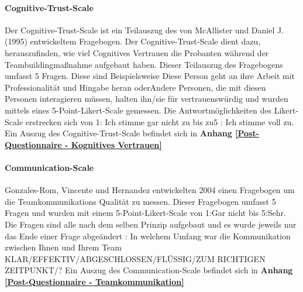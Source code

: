 \documentclass[a4paper,11pt]{article}%
\renewcommand{\\}{\vspace*{0.5\baselineskip} \newline}
\begin{document}
		\paragraph{Cognitive-Trust-Scale}
Der Cognitive-Trust-Scale ist ein Teilauszug des von McAllister und Daniel J. (1995) \citep[p.37]{mcallister1995affect} entwickeltem Fragebogen. Der Cognitive-Trust-Scale dient dazu, herauszufinden, wie viel Cognitives Vertrauen die Probanten während der Teambuildingmaßnahme aufgebaut haben. Dieser Teilauszug des Fragebogens umfasst 5 Fragen. Diese sind Beispielsweise \dq{}Diese Person geht an ihre Arbeit mit Professionalität und Hingabe heran \dq{} oder\dq{}Andere Personen, die mit diesen Personen interagieren müssen, halten ihn/sie für vertrauenswürdig und wurden mittels eines 5-Point-Likert-Scale gemessen. Die Antwortmöglichkeiten des Likert-Scale erstrecken sich von \dq{}1: Ich stimme gar nicht zu \dq{} bis zu\dq{}5 : Ich stimme voll zu. 
\\Ein Auszug des Cognitive-Trust-Scale befindet sich in \textbf{Anhang \ref{Post-Questionnaire - Kognitives Vertrauen}}

  


		\paragraph{Communication-Scale}
Gonzales-Rom, Vincente und Hernandez \citep[p.1049]{gonzalez2014climate}entwickelten 2004 einen Fragebogen um die Teamkommunikations Qualität zu messen. Dieser Fragebogen umfasst 5 Fragen und wurden mit einem 5-Point-Likert-Scale von \dq{}1:Gar nicht\dq{} bis \dq{}5:Sehr\dq{}. Die Fragen sind alle nach dem selben Prinzip aufgebaut und es wurde jeweils nur das Ende einer Frage abgeändert : \dq{}In welchem Umfang war die Kommunikation zwischen Ihnen und Ihrem Team KLAR/EFFEKTIV/ABGESCHLOSSEN/FLÜSSIG/ZUM RICHTIGEN ZEITPUNKT/?\dq{} 
\\Ein Auszug des Communication-Scale befindet sich in \textbf{Anhang \ref{Post-Questionnaire - Teamkommunikation}}
\end{document}

